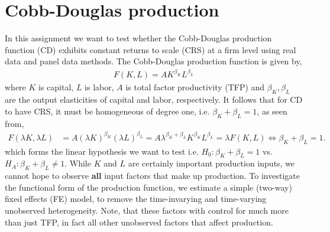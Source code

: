 \section{Cobb-Douglas production} \label{sec:intro}

In this assignment we want to test whether the Cobb-Douglas production function (CD) exhibits constant returns to scale (CRS) at a firm level using real data and panel data methods. The Cobb-Douglas production function is given by,
\begin{align} \label{eq:CD}
    F(K,L) = A K^{\beta_K} L^{\beta_L}
\end{align}
where $K$ is capital, $L$ is labor, $A$ is total factor productivity (TFP) and $\beta_K, \beta_L$ are the output elasticities of capital and labor, respectively.
It follows that for CD to have CRS, it must be homogeneous of degree one, i.e. $\beta_K + \beta_L = 1$, as seen from,
\begin{align*} 
    F(\lambda K, \lambda L) &= A (\lambda K)^{\beta_K} (\lambda L)^{\beta_L} = A \lambda^{\beta_K + \beta_L} K^{\beta_K} L^{\beta_L} = \lambda F(K,L) \iff \beta_K + \beta_L = 1.
\end{align*} 
which forms the linear hypothesis we want to test i.e. $H_0: \beta_K + \beta_L = 1$ vs. $H_A: \beta_K + \beta_L \neq 1$.
While $K$ and $L$ are certainly important production inputs, we cannot hope to observe \textbf{all} input factors that make up production. To investigate the functional form of the production function, we estimate a simple (two-way) fixed effects (FE) model, to remove the time-invarying and time-varying unobserved heterogeneity. Note, that these factors with control for much more than just TFP, in fact all other unobserved factors that affect production. 


